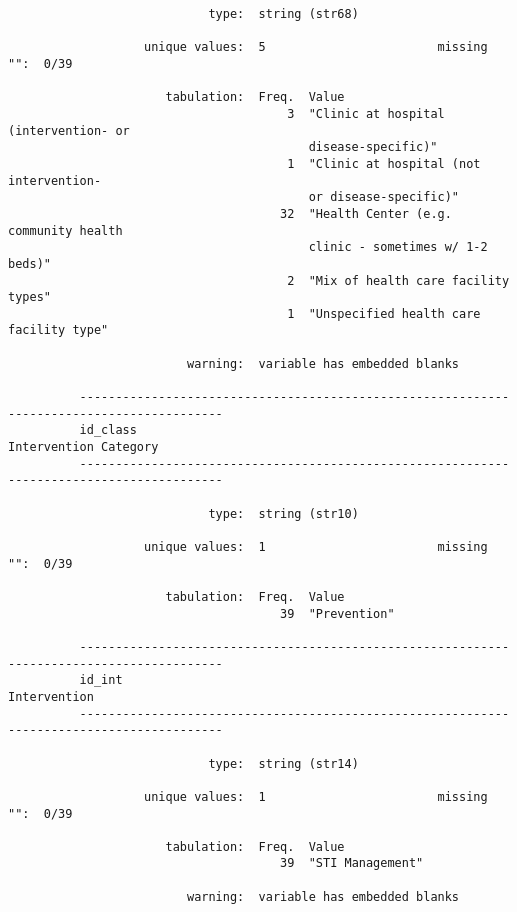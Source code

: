 \documentclass{article}
\begin{document}
\begin{verbatim}
                            type:  string (str68)
          
                   unique values:  5                        missing "":  0/39
          
                      tabulation:  Freq.  Value
                                       3  "Clinic at hospital (intervention- or
                                          disease-specific)"
                                       1  "Clinic at hospital (not intervention-
                                          or disease-specific)"
                                      32  "Health Center (e.g. community health
                                          clinic - sometimes w/ 1-2 beds)"
                                       2  "Mix of health care facility types"
                                       1  "Unspecified health care facility type"
          
                         warning:  variable has embedded blanks
          
          ------------------------------------------------------------------------------------------
          id_class                                                             Intervention Category
          ------------------------------------------------------------------------------------------
          
                            type:  string (str10)
          
                   unique values:  1                        missing "":  0/39
          
                      tabulation:  Freq.  Value
                                      39  "Prevention"
          
          ------------------------------------------------------------------------------------------
          id_int                                                                        Intervention
          ------------------------------------------------------------------------------------------
          
                            type:  string (str14)
          
                   unique values:  1                        missing "":  0/39
          
                      tabulation:  Freq.  Value
                                      39  "STI Management"
          
                         warning:  variable has embedded blanks
          

\end{verbatim}
\end{document}
